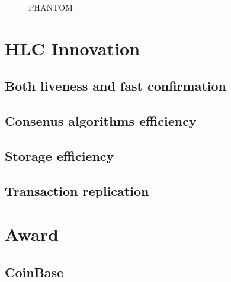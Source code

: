 \documentclass[a4paper,11pt]{article}
\begin{document}
\begin{figure}[h]
	\centerline{%
	}
\caption{PHANTOM}
\end{figure}

\section{HLC Innovation}
\subsection{Both liveness and fast confirmation} 
\subsection{Consenus algorithms efficiency} 
\subsection{Storage efficiency} 
\subsection{Transaction replication} 

\section{Award}
\subsection{CoinBase}
\end{document}
